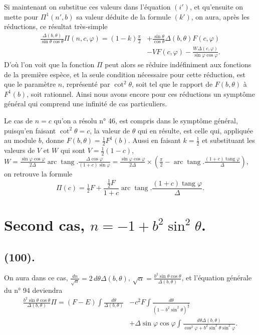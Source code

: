 \documentclass{article}
\begin{document}
Si maintenant on substitue ces valeurs dans l'équation $(i')$, et qu'ensuite on mette pour $\Pi^{1}(n',b)$ sa valeur déduite de la formule $(k')$, on aura, après les réductions, ce résultat très-simple
\[ \begin{aligned} \frac{\Delta(b,\theta)}{\sin\theta\cos\theta}\Pi(n,c,\varphi)=(1-k)\frac{\pi}{2}&+\frac{\sin\theta}{\cos\theta}\Delta(b,\theta)F(c,\varphi)\\ &-VF(c,\varphi)-\frac{W\Delta(c,\varphi)}{\sin\varphi\cos\varphi}. \end{aligned} \]
D'où l'on voit que la fonction $\Pi$ peut alors se réduire indéfiniment aux fonctions de la première espèce, et la seule condition nécessaire pour cette réduction, est que le paramètre $n$, représenté par $\cot^{2}\theta$, soit tel que le rapport de $F(b,\theta)$ à $F^{1}(b)$, soit rationnel. Ainsi nous avons encore pour ces réductions un symptôme général qui comprend une infinité de cas particuliers.

Le cas de $n=c$ qu'on a résolu n° 46, est compris dans le symptôme général, puisqu'en faisant $\cot^{2}\theta=c$, la valeur de $\theta$ qui en résulte, est celle qui, appliquée au module $b$, donne $F(b,\theta)=\tfrac{1}{2}F^{1}(b)$. Aussi en faisant $k=\tfrac{1}{2}$ et substituant les valeurs de $V$ et $W$ qui sont $V=\tfrac{1}{2}(1-c)$, $W=\frac{\sin\varphi\cos\varphi}{2\Delta}\operatorname{arc}\operatorname{tang}.\frac{\Delta\cos\varphi}{(1+c)\sin\varphi}=\frac{\sin\varphi\cos\varphi}{2\Delta}\times\left(\frac{\pi}{2}-\operatorname{arc}\operatorname{tang}.\frac{(1+c)\operatorname{tang}\varphi}{\Delta}\right)$, on retrouve la formule
\[ \Pi(c)=\tfrac{1}{2}F+\frac{\tfrac{1}{2}F}{1+c}\operatorname{arc}\operatorname{tang}.\frac{(1+c)\operatorname{tang}\varphi}{\Delta}. \]

\section*{Second cas, $n=-1+b^{2}\sin^{2}\theta$.}

\subsection*{(100).}

On aura dans ce cas, $\frac{dn}{\sqrt{\alpha}}=2\,d\theta\Delta(b,\theta)$, $\sqrt{\alpha}=\frac{b^{2}\sin\theta\cos\theta}{\Delta(b,\theta)}$, et l'équation générale du n° 94 deviendra
\[ \begin{aligned} \frac{b^{2}\sin\theta\cos\theta}{\Delta(b,\theta)}\Pi=(F-E)\int\frac{d\theta}{\Delta(b,\theta)}&-c^{2}F\int\frac{d\theta}{(1-b^{2}\sin^{2}\theta)^{\frac{3}{2}}}\\ &+\Delta\sin\varphi\cos\varphi\int\frac{d\theta\Delta(b,\theta)}{\cos^{2}\varphi+b^{2}\sin^{2}\theta\sin^{2}\varphi}. \end{aligned} \]
\end{document}
